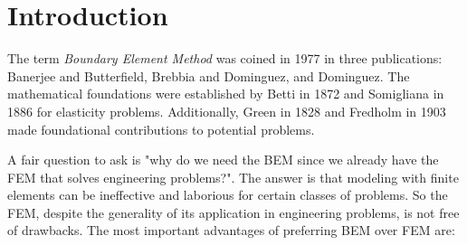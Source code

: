
\section{Introduction}
\label{sec:Introduction}

The term \emph{Boundary Element Method} was coined in 1977 in three publications: Banerjee and Butterfield, Brebbia and Dominguez, and Dominguez. The mathematical foundations were established by Betti in 1872 and Somigliana in 1886 for elasticity problems. Additionally, Green in 1828 and Fredholm in 1903 made foundational contributions to potential problems.

A fair question to ask is "why do we need the BEM since we already have the FEM that solves engineering problems?". The answer is that modeling with finite elements can be ineffective and laborious for certain classes of problems. So the FEM, despite the generality of its application in engineering problems, is not free of drawbacks. The most important advantages of preferring BEM over FEM are:

